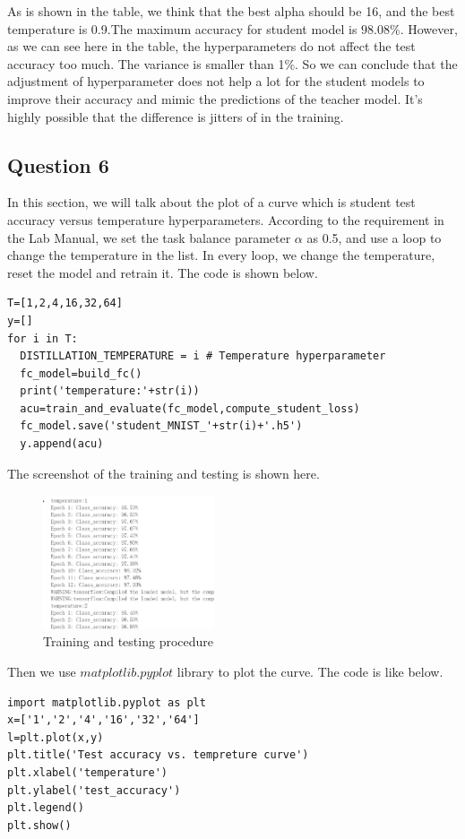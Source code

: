 \documentclass[conference]{IEEEtran}
\begin{document}
As is shown in the table, we think that the best alpha should be 16, and the best temperature is 0.9.The maximum accuracy for student model is $98.08\%$. However, as we can see here in the table, the hyperparameters do not affect the test accuracy too much. The variance is smaller than 1\%. So we can conclude that the adjustment of hyperparameter does not help a lot for the student models to improve their accuracy and mimic the predictions of the teacher model. It's highly possible that the difference is jitters of in the training.
\subsection{Question 6}
In this section, we will talk about the plot of a curve which is student test accuracy versus temperature hyperparameters. 
According to the requirement in the Lab Manual, we set the task balance parameter $\alpha$ as 0.5, and use a loop to change the temperature in the list.
In every loop, we change the temperature, reset the model and retrain it. The code is shown below.
\begin{lstlisting}
T=[1,2,4,16,32,64]
y=[]
for i in T:
  DISTILLATION_TEMPERATURE = i # Temperature hyperparameter
  fc_model=build_fc()
  print('temperature:'+str(i))
  acu=train_and_evaluate(fc_model,compute_student_loss)
  fc_model.save('student_MNIST_'+str(i)+'.h5')
  y.append(acu)
\end{lstlisting}
The screenshot of the training and testing is shown here.
\begin{figure}[h] 
    \centering
    \includegraphics[width=0.45\textwidth]{./graphs/T1Q6_train.png}
    \caption{Training and testing procedure}
    \label{Fig.t1q3e}
\end{figure}
Then we use $matplotlib.pyplot$ library to plot the curve.
The code is like below.
\begin{lstlisting}
import matplotlib.pyplot as plt
x=['1','2','4','16','32','64']
l=plt.plot(x,y)
plt.title('Test accuracy vs. tempreture curve')
plt.xlabel('temperature')
plt.ylabel('test_accuracy')
plt.legend()
plt.show()
\end{lstlisting}
\end{document}
